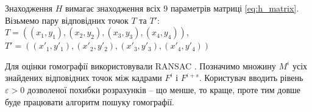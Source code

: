 Знаходження $H$ вимагає знаходження всіх 9 параметрів матриці \ref{eq:h_matrix}.
Візьмемо пару відповідних точок $T$ та $T'$:
$T = ((x_1,y_1), (x_2,y_2), (x_3,y_3), (x_4,y_4))$, 
$T' = ((x'_1,y'_1), (x'_2,y'_2), (x'_3,y'_3), (x'_4,y'_4))$ 




Для оцінки гомографії використовували RANSAC \cite{Fischler1981RandomSC}.
Позначимо множину \(M^{i}\) усіх знайдених відповідних точок між кадрами
\(F^{i}\) і \(F^{i + s}\). Користувач вводить рівень \(\varepsilon > 0\)
дозволеної похибки розрахунків -- що менше, то краще, проте тим довше
буде працювати алгоритм пошуку гомографії.


